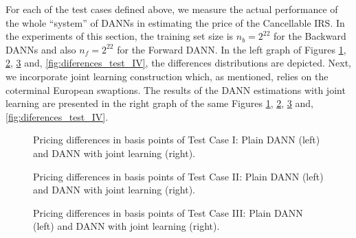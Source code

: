 		For each of the test cases defined above, we measure the actual performance of the whole ``system'' of DANNs in estimating the price of the Cancellable IRS. In the experiments of this section, the training set size is $n_b = 2^{22}$ for the Backward DANNs and also $n_f = 2^{22}$ for the Forward DANN. In the left graph of Figures \ref{fig:diferences_test_I}, \ref{fig:diferences_test_II}, \ref{fig:diferences_test_III} and, \ref{fig:diferences_test_IV}, the differences distributions are depicted. Next, we incorporate joint learning construction which, as mentioned, relies on the coterminal European swaptions. The results of the DANN estimations with joint learning are presented in the right graph of the same Figures \ref{fig:diferences_test_I}, \ref{fig:diferences_test_II}, \ref{fig:diferences_test_III} and, \ref{fig:diferences_test_IV}.
		\begin{figure}[h!]
			\centering
			\caption{Pricing differences in basis points of Test Case I: Plain DANN (left) and DANN with joint learning (right).}
			\label{fig:diferences_test_I}
		\end{figure}

		\begin{figure}[h!]
			\centering
			\caption{Pricing differences in basis points of Test Case II: Plain DANN (left) and DANN with joint learning (right).}
			\label{fig:diferences_test_II}
		\end{figure}

		\begin{figure}[h!]
			\centering
			\caption{Pricing differences in basis points of Test Case III: Plain DANN (left) and DANN with joint learning (right).}
			\label{fig:diferences_test_III}
		\end{figure}


